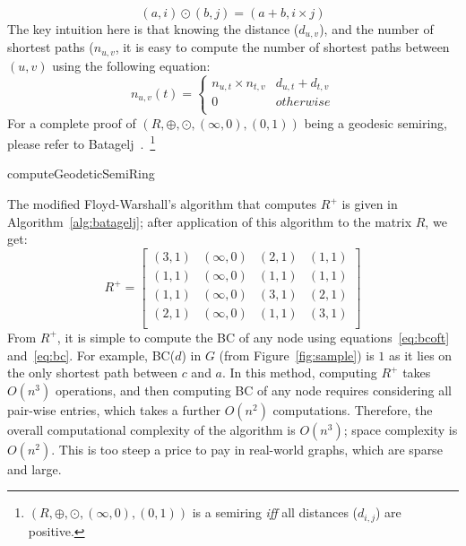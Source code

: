 \begin{equation}
(a,i)\odot{}(b,j) = (a+b, i\times{}j)
\label{eq:odot}
\end{equation}
%
The key intuition here is that knowing the distance ($d_{u,v}$), and the number
of shortest paths ($n_{u,v}$, it is easy to compute the number of shortest
paths between $(u,v)$ using the following equation:
%
\begin{equation}
n_{u,v}(t) = \left\{ \begin{array}{rr} 
  n_{u,t}\times{}n_{t,v} & d_{u,t}+d_{t,v} \\
  0 & otherwise \\
\end{array}\right.
\label{eq:bcoft}
\end{equation}
%
For a complete proof of $(R, \oplus{}, \odot{}, (\infty,0), (0,1))$ being a 
geodesic semiring, please refer to Batagelj~\cite{Batagelj-1994}.~\footnote{
$(R, \oplus{}, \odot{}, (\infty,0), (0,1))$ is a semiring \textit{iff} all 
distances ($d_{i,j}$) are positive.}
%

\begin{algorithm}

\caption{computeGeodeticSemiRing}
\label{alg:batagelj}

\end{algorithm}
%
The modified Floyd-Warshall's algorithm that computes $R^+$ is given in
Algorithm~\ref{alg:batagelj}; after application of this algorithm to the 
matrix $R$, we get:
%
\begin{displaymath}
R^+ = \left[ \begin{array}{cccc}
  (3,1) & (\infty{},0) & (2,1) & (1,1) \\
  (1,1) & (\infty{},0) & (1,1) & (1,1) \\
  (1,1) & (\infty{},0) & (3,1) & (2,1) \\
  (2,1) & (\infty{},0) & (1,1) & (3,1) \\
\end{array} \right]
\end{displaymath}
%
From $R^+$, it is simple to compute the BC of any node using
equations~\ref{eq:bcoft} and~\ref{eq:bc}.
%
For example, BC($d$) in $G$ (from Figure~\ref{fig:sample}) is $1$ as it lies 
on the only shortest path between $c$ and $a$.
%
In this method, computing $R^+$ takes $O(n^3)$ operations, and then computing
BC of any node requires considering all pair-wise entries, which takes a
further $O(n^2)$ computations.
%
Therefore, the overall computational complexity of the algorithm is $O(n^3)$;
space complexity is $O(n^2)$.
%
This is too steep a price to pay in real-world graphs, which are sparse and 
large.

